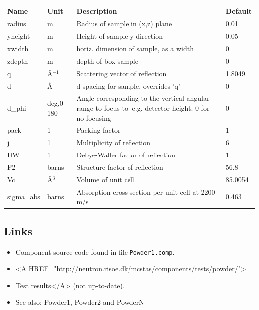 \begin{longtable}{p{}p{}p{}p{}}
\toprule
\textbf{Name} & \textbf{Unit} & \textbf{Description} & \textbf{Default} \\
\midrule
\endhead
radius & m & Radius of sample in (x,z) plane & 0.01 \\
yheight & m & Height of sample y direction & 0.05 \\
xwidth & m & horiz. dimension of sample, as a width & 0 \\
zdepth & m & depth of box sample & 0 \\
q & \AA{}$^{-1}$ & Scattering vector of reflection & 1.8049 \\
d & \AA{} & d-spacing for sample, overrides 'q' & 0 \\
d\_phi & deg,0-180 & Angle corresponding to the vertical angular range to focus to, e.g. detector height. 0 for no focusing & 0 \\
pack & 1 & Packing factor & 1 \\
j & 1 & Multiplicity of reflection & 6 \\
DW & 1 & Debye-Waller factor of reflection & 1 \\
F2 & barns & Structure factor of reflection & 56.8 \\
Vc & \AA{}$^{3}$ & Volume of unit cell & 85.0054 \\
sigma\_abs & barns & Absorption cross section per unit cell at 2200 m/s & 0.463 \\
\bottomrule
\end{longtable}

\subsection*{Links}
\begin{itemize}
  \item Component source code found in file \texttt{Powder1.comp}.
  \item \textless{}A HREF="http://neutron.risoe.dk/mcstas/components/tests/powder/"\textgreater{}
  \item Test results\textless{}/A\textgreater{} (not up-to-date).
  \item See also: Powder1, Powder2 and PowderN
\end{itemize}
